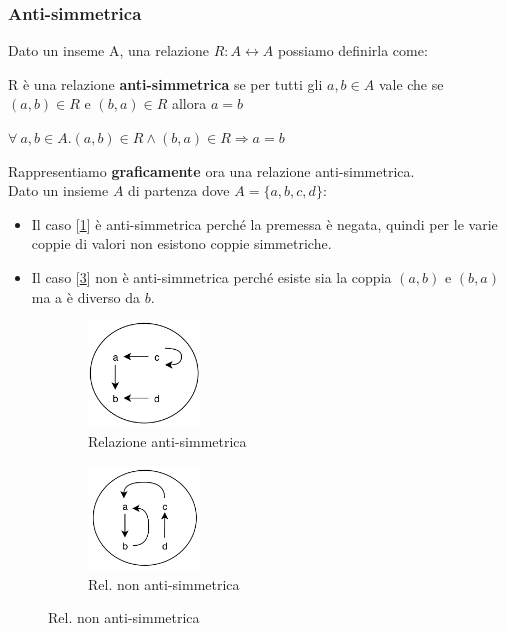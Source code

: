 \subsubsection{Anti-simmetrica}
Dato un inseme A, una relazione $R: A \leftrightarrow A$ possiamo definirla come:
\begin{definition}
    R è una relazione \textbf{anti-simmetrica} se per tutti gli $a,b \in A$ vale che se $(a, b) \in R$ e $(b, a) \in R$ allora $a = b$
    \begin{center}
        $\forall \: a,b \in A . (a, b) \in R \land (b, a) \in R \Rightarrow a = b$
    \end{center}
\end{definition}
Rappresentiamo \textbf{graficamente} ora una relazione anti-simmetrica. \\Dato un insieme $A$ di partenza dove $A = \{a, b, c, d\}$:
\begin{itemize}
    \item Il caso [\ref{fig:relazione-anti-simmetrica}] è anti-simmetrica perché la premessa è negata, quindi per le varie coppie di valori non esistono coppie simmetriche.
    \item Il caso [\ref{fig:relazione-non-anti-simmetrica}] non è anti-simmetrica perché esiste sia la coppia $(a,b)$ e $(b,a)$ ma a è diverso da $b$.
\end{itemize}
\begin{figure}[h!]
    \vspace{-10pt}
    \centering
    \begin{subfigure}{.3\textwidth}
        \centering
        \includegraphics[width=3cm]{images/relazione-anti-simmetrica.png}
        \caption{Relazione anti-simmetrica}
        \label{fig:relazione-anti-simmetrica}
    \end{subfigure}
    \hspace{1.5cm}
    \begin{subfigure}{.3\textwidth}
        \centering
        \includegraphics[width=3cm]{images/relazione-non-anti-simmetrica.png}
        \caption{Rel. non anti-simmetrica}
        \label{fig:relazione-non-anti-simmetrica}
    \end{subfigure}
\end{figure}
